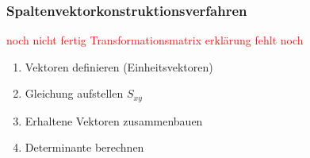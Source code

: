 \subsubsection{Spaltenvektorkonstruktionsverfahren}
\textcolor{red}{noch nicht fertig Transformationsmatrix erklärung fehlt noch}
\begin{enumerate}
    \item Vektoren definieren (Einheitsvektoren)
    \item Gleichung aufstellen $S_{xy}$
    \item Erhaltene Vektoren zusammenbauen
    \item Determinante berechnen
\end{enumerate}
